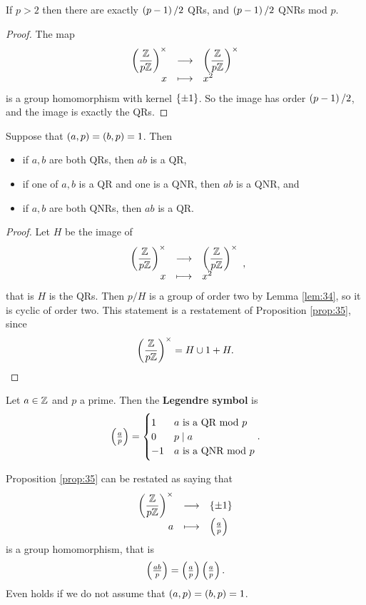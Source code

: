 \begin{lemma}
\label{lem:34}
If $ p > 2 $ then there are exactly $ \br{p - 1} / 2 $ QRs, and $ \br{p - 1} / 2 $ QNRs mod $ p $.
\end{lemma}

\begin{proof}
The map
$$ \function{\Unit{p}}{\Unit{p}}{x}{x^2} $$
is a group homomorphism with kernel $ \cbr{\pm 1} $. So the image has order $ \br{p - 1} / 2 $, and the image is exactly the QRs.
\end{proof}

\begin{proposition}
\label{prop:35}
Suppose that $ \br{a, p} = \br{b, p} = 1 $. Then
\begin{itemize}
\item if $ a, b $ are both QRs, then $ ab $ is a QR,
\item if one of $ a, b $ is a QR and one is a QNR, then $ ab $ is a QNR, and
\item if $ a, b $ are both QNRs, then $ ab $ is a QR.
\end{itemize}
\end{proposition}

\begin{proof}
Let $ H $ be the image of
$$ \function{\Unit{p}}{\Unit{p}}{x}{x^2}, $$
that is $ H $ is the QRs. Then $ \unit{p} / H $ is a group of order two by Lemma \ref{lem:34}, so it is cyclic of order two. This statement is a restatement of Proposition \ref{prop:35}, since
$$ \Unit{p} = H \cup 1 + H. $$
\end{proof}

\begin{definition}
Let $ a \in \mathbb{Z} $ and $ p $ a prime. Then the \textbf{Legendre symbol} is
$$ \jacobi{a}{p} =
\begin{cases}
1 & a \ \text{is a QR mod} \ p \\
0 & p \mid a \\
-1 & a \ \text{is a QNR mod} \ p
\end{cases}.
$$
\end{definition}

Proposition \ref{prop:35} can be restated as saying that
$$ \function{\Unit{p}}{\cbr{\pm 1}}{a}{\jacobi{a}{p}} $$
is a group homomorphism, that is
$$ \jacobi{ab}{p} = \jacobi{a}{p}\jacobi{a}{p}. $$
Even holds if we do not assume that $ \br{a, p} = \br{b, p} = 1 $.

\pagebreak


